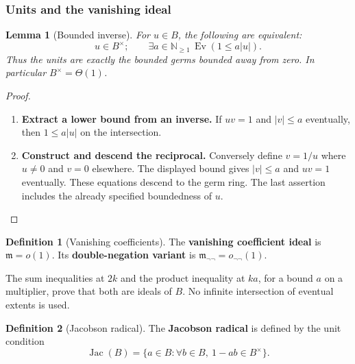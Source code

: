 \documentclass[11pt,a4paper]{article}
\numberwithin{algorithm}{section}
\numberwithin{equation}{section}
\newtheorem{lemma}[lemma]{Lemma}
\theoremstyle{definition}
\newtheorem{definition}[definition]{Definition}
\theoremstyle{remark}
\theoremstyle{plain}
\newcommand{\N}{\mathbb N}
\newcommand{\Ev}{{\operatorname{Ev}}}
\newcommand{\abs}[1]{\lvert #1\rvert}
\newcommand{\Jac}{\operatorname{Jac}}
\newcommand{\onn}{o_{\neg\neg}}
\theoremstyle{definition}
\theoremstyle{plain}
\begin{document}
\subsubsection{Units and the vanishing ideal}
\begin{lemma}[Bounded inverse]\label{lem:units}
For $u\in B$, the following are equivalent:
\[
 u\in B^\times;\qquad
 \exists a\in\N_{\ge1}\,\Ev(1\le a\abs u).
\]
Thus the units are exactly the bounded germs bounded away from
zero. In particular $B^\times=\Theta(1)$.
\end{lemma}
\begin{proof}\leavevmode
\begin{enumerate}[leftmargin=*,align=left]
\item \textbf{Extract a lower bound from an inverse.}
If $uv=1$ and $\abs v\le a$ eventually, then $1\le a\abs u$
on the intersection.

\item \textbf{Construct and descend the reciprocal.}
Conversely define $v=1/u$ where $u\ne0$
and $v=0$ elsewhere. The displayed bound gives $\abs v\le a$
and $uv=1$ eventually. These equations descend to the germ
ring. The last assertion includes the already specified
boundedness of $u$.
\end{enumerate}
\end{proof}

\begin{definition}[Vanishing coefficients]\label{def:vanishing-coefficients}
The \textbf{vanishing coefficient ideal} is $\mathfrak m=o(1)$.
Its \textbf{double-negation variant} is
$\mathfrak m_{\neg\neg}=\onn(1)$.
\end{definition}
The sum inequalities at $2k$ and the product inequality at
$ka$, for a bound $a$ on a multiplier, prove that both are
ideals of $B$. No infinite intersection of eventual extents
is used.

\begin{definition}[Jacobson radical]\label{def:jacobson-radical}
The \textbf{Jacobson radical} is defined by the unit condition
\[
 \Jac(B)=\{a\in B:\forall b\in B,\ 1-ab\in B^\times\}.
\]
\end{definition}
\end{document}
